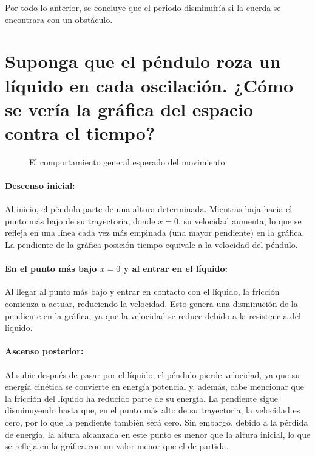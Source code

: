 \documentclass[letterpaper]{report}
\numberwithin{table}{section}
\begin{document}
Por todo lo anterior, se concluye que el periodo disminuiría si la
cuerda se encontrara con un obstáculo.

\section*{Suponga que el péndulo roza un líquido en cada
oscilación. ¿Cómo se vería la gráfica del espacio contra el tiempo?}

\begin{figure}[ht]
  \centering
  \caption{El comportamiento general esperado del
  movimiento}\label{fig:líquido}
\end{figure}

\paragraph{Descenso inicial:} Al inicio, el péndulo
parte de una altura determinada. Mientras baja hacia el punto más
bajo de su trayectoria, donde $x=0$, su velocidad aumenta, lo que se
refleja en una línea cada vez más empinada (una mayor pendiente)
en la gráfica. La pendiente de la gráfica posición-tiempo equivale a la
velocidad del péndulo.

\paragraph{En el punto más bajo $x=0$ y al entrar en el líquido:} Al llegar al
punto más bajo y entrar en contacto con el líquido, la fricción
comienza a actuar, reduciendo la velocidad. Esto genera una
disminución de la pendiente en la gráfica, ya que la velocidad se
reduce debido a la resistencia del líquido.

\paragraph{Ascenso posterior:} Al subir después de pasar por el líquido, el
péndulo pierde velocidad, ya que su energía cinética se
convierte en energía potencial y, además, cabe mencionar que la
fricción del líquido ha reducido parte de su energía. La pendiente
sigue disminuyendo hasta que, en el punto más alto de su trayectoria,
la velocidad es cero, por lo que la pendiente también será cero. Sin
embargo, debido a la pérdida de energía, la altura alcanzada en este
punto es menor que la altura inicial, lo que se refleja en la gráfica
con un valor menor que el de partida.
\end{document}
